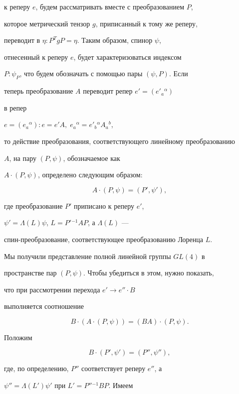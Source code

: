 к реперу $e$, будем рассматривать вместе с преобразованием $P$,


которое метрический тензор $g$, приписанный к тому же реперу,


переводит в $\eta:P^T gP=\eta$. Таким образом, спинор $\psi$,


отнесенный к реперу $e$, будет характеризоваться индексом


$P:\psi_P$, что будем обозначать с помощью пары $(\psi,P)$. Если


теперь преобразование $A$ переводит репер $e'=(e'_a{}^\alpha)$


в репер


$e=(e_a{}^\alpha):e=e'A,\; e_a{}^\alpha=e'_b{}^\alpha A_a{}^b$,


то действие преобразования, соответствующего линейному преобразованию


$A$, на пару $(P,\psi)$, обозначаемое как


$A\cdot(P,\psi)$, определено следующим образом:


$$


A\cdot(P,\psi)=(P',\psi'),


$$


где преобразование $P'$ приписано к реперу $e'$,


$\psi'=\Lambda (L)\psi$, $L=P'{}^{-1}AP$, а $\Lambda(L)$ ---


спин-преобразование, соответствующее преобразованию Лоренца $L$.





Мы получили представление полной линейной группы $GL(4)$ в


пространстве пар $(P,\psi)$. Чтобы убедиться в этом, нужно показать,


что при рассмотрении перехода $e'\rightarrow e''\cdot B$


выполняется соотношение


\begin{equation}


B\cdot (A\cdot(P,\psi))=(BA)\cdot (P,\psi).


\end{equation}


Положим


$$


B\cdot (P',\psi')=(P'',\psi''),


$$


где, по определению, $P''$ соответствует реперу $e''$, а


$\psi''=\Lambda(L')\psi'$ при $L'=P''{}^{-1}BP$. Имеем


